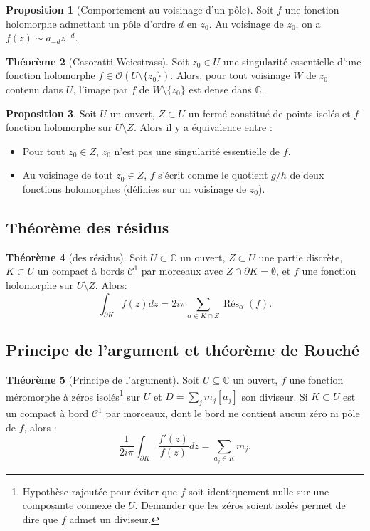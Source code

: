 \documentclass[11pt,a4paper]{article}
\newcommand{\C}{\mathbb{C}}
\theoremstyle{definition}
\newtheorem{theoreme}{Th\'eor\`eme}[section]
\newtheorem{proposition}[theoreme]{Proposition}
\theoremstyle{plain}
\begin{document}
\begin{proposition}[Comportement au voisinage d'un pôle]
Soit $f$ une fonction holomorphe admettant un pôle d'ordre $d$ en $z_0$.
Au voisinage de $z_0$, on a $f(z) \sim a_{-d}z^{-d}$.
\end{proposition}

\begin{theoreme}[Casoratti-Weiestrass]
Soit $z_0 \in U$ une singularité essentielle d'une fonction holomorphe $f \in \mathcal O(U\setminus \{z_0\})$.
Alors, pour tout voisinage $W$ de $z_0$ contenu dans $U$, l'image par $f$ de $W\setminus\{z_0\}$ est dense dans $\C$.
\end{theoreme}


\begin{proposition}
Soit $U$ un ouvert,  $Z\subset U$ un fermé constitué de points isolés et $f$ fonction holomorphe sur $U\setminus Z$.
Alors il y a équivalence entre :
\begin{itemize}
\item Pour tout $z_0\in Z$, $z_0$ n'est pas une singularité essentielle de $f$.
\item Au voisinage de tout $z_0\in Z$, $f$ s'écrit comme le quotient $g/h$ de deux fonctions holomorphes (définies sur un voisinage de $z_0$).
\end{itemize}
\end{proposition}


\subsection{Théorème des résidus}


\begin{theoreme}[des résidus]
Soit $U\subset \C$ un ouvert, $Z\subset U$ une partie discrète, $K\subset U$ un compact à bords $\mathcal C^1$ par morceaux avec $Z\cap \partial K = \emptyset$, et $f$ une fonction holomorphe sur $U\setminus Z$.
Alors:
\[ \int_{\partial K} f(z)dz = 2i\pi \sum_{\alpha \in K\cap Z} \operatorname{Rés}_\alpha(f).\]
\end{theoreme}



\subsection{Principe de l'argument et théorème de Rouché}



\begin{theoreme}[Principe de l'argument]
Soit $U\subseteq \C$ un ouvert, $f$ une fonction méromorphe à zéros isolés\footnote{Hypothèse rajoutée pour éviter que $f$ soit identiquement nulle sur une composante connexe de $U$. Demander que les zéros soient isolés permet de dire que $f$ admet un diviseur.} sur $U$ et $D = \sum_{j} m_j[a_j]$ son diviseur.
Si $K\subset U$ est un compact à bord $\mathcal C^1$ par morceaux, dont le bord ne contient aucun zéro ni pôle de $f$, alors :
\[ \frac{1}{2i\pi} \int_{\partial K} \frac{f'(z)}{f(z)}dz = \sum_{a_j \in K} m_j.\]
\end{theoreme}
\end{document}

